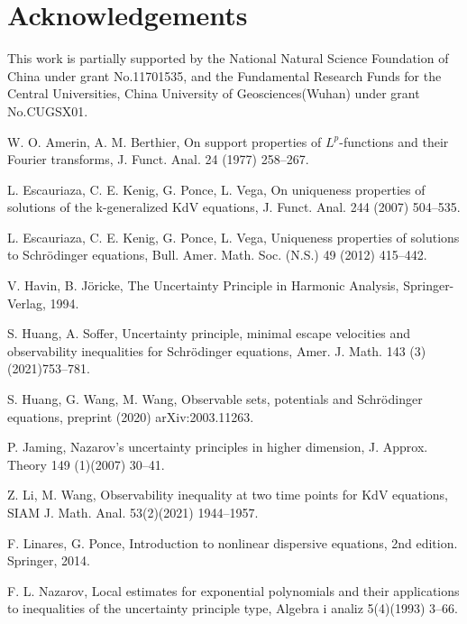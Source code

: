 \documentclass[preprint,12pt]{elsarticle}
\begin{document}
\section*{Acknowledgements}

This work is partially supported by the National Natural Science Foundation of China under grant No.11701535, and the Fundamental Research Funds for the Central Universities, China University of Geosciences(Wuhan) under grant No.CUGSX01.

\begin{thebibliography}{999}

 {\footnotesize


 W. O. Amerin, A. M. Berthier, On support properties of $L^p$-functions and their Fourier transforms, J. Funct. Anal. 24 (1977) 258--267.


  L. Escauriaza, C. E. Kenig, G. Ponce, L. Vega, On uniqueness properties of solutions
of the k-generalized KdV equations, J. Funct. Anal.  244 (2007) 504--535.

  L. Escauriaza, C. E. Kenig, G. Ponce, L. Vega, Uniqueness properties of solutions to Schr\"{o}dinger equations,
Bull. Amer. Math. Soc. (N.S.) 49 (2012) 415--442.

 V. Havin, B. J\"{o}ricke,  The Uncertainty Principle in Harmonic Analysis, Springer-Verlag, 1994.


 S. Huang, A. Soffer, Uncertainty principle, minimal escape velocities and observability
inequalities for Schr\"{o}dinger equations,  Amer. J. Math. 143 (3) (2021)753--781.

 S. Huang, G. Wang, M. Wang, Observable sets, potentials and Schr\"{o}dinger equations, preprint (2020) arXiv:2003.11263.

 P. Jaming, Nazarov's uncertainty principles in higher dimension, J. Approx. Theory 149 (1)(2007) 30--41.

 Z. Li, M. Wang, Observability inequality at two time points for KdV equations, SIAM J. Math. Anal. 53(2)(2021) 1944--1957.

 F. Linares, G. Ponce, Introduction to nonlinear dispersive equations, 2nd edition. Springer, 2014.


 F. L. Nazarov, Local estimates for exponential polynomials and their applications to inequalities of the
uncertainty principle type, Algebra i analiz 5(4)(1993) 3--66.

}
\end{thebibliography}
\end{document}
